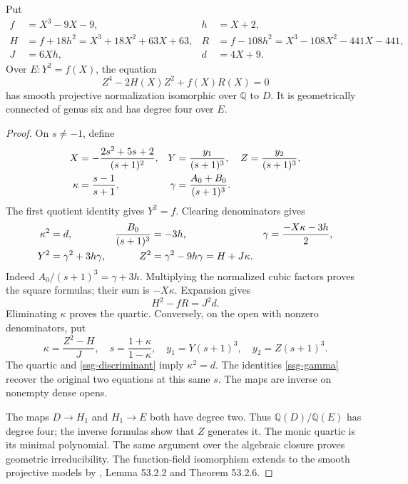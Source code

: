 \begin{theorem}\label{ssg-quartic}
Put
\begin{align*}
 f&=X^3-9X-9,& h&=X+2,\\
 H&=f+18h^2=X^3+18X^2+63X+63,&
 R&=f-108h^2=X^3-108X^2-441X-441,\\
 J&=6Xh,& d&=4X+9.
\end{align*}
Over \(E:Y^2=f(X)\), the equation
\begin{equation}\label{ssg-equation}
 Z^4-2H(X)Z^2+f(X)R(X)=0
\end{equation}
has smooth projective normalization isomorphic over \(\mathbb Q\) to
\(D\). It is geometrically connected of genus six and has degree four over \(E\).
\end{theorem}
\begin{proof}
On \(s\ne-1\), define
\begin{align}
 X&=-\frac{2s^2+5s+2}{(s+1)^2},&
 Y&=\frac{y_1}{(s+1)^3},&
 Z&=\frac{y_2}{(s+1)^3},\label{ssg-forward}\\
 \kappa&=\frac{s-1}{s+1},&
 \gamma&=\frac{A_0+B_0}{(s+1)^3}.&&\notag
\end{align}
The first quotient identity gives \(Y^2=f\). Clearing denominators gives
\begin{align}
 \kappa^2&=d,& \frac{B_0}{(s+1)^3}&=-3h,
 &\gamma&=\frac{-X\kappa-3h}{2},\label{ssg-gamma}\\
 Y^2&=\gamma^2+3h\gamma,&
 Z^2&=\gamma^2-9h\gamma=H+J\kappa.&&\notag
\end{align}
Indeed \(A_0/(s+1)^3=\gamma+3h\). Multiplying the normalized
cubic factors proves the square formulas; their sum is \(-X\kappa\).
Expansion gives
\begin{equation}\label{ssg-discriminant}
 H^2-fR=J^2d.
\end{equation}
Eliminating \(\kappa\) proves the quartic.
Conversely, on the open with nonzero denominators, put
\begin{equation}\label{ssg-inverse}
 \kappa=\frac{Z^2-H}{J},\quad
 s=\frac{1+\kappa}{1-\kappa},\quad
 y_1=Y(s+1)^3,\quad y_2=Z(s+1)^3.
\end{equation}
The quartic and \eqref{ssg-discriminant} imply \(\kappa^2=d\).
The identities \eqref{ssg-gamma} recover the original two equations
at this same \(s\). The maps are inverse on nonempty dense opens.

The maps \(D\to H_1\) and \(H_1\to E\) both have degree two.
Thus \(\mathbb Q(D)/\mathbb Q(E)\) has degree four; the inverse
formulas show that \(Z\) generates it. The monic quartic is its
minimal polynomial. The same argument over the algebraic closure
proves geometric irreducibility. The function-field isomorphism
extends to the smooth projective models by \cite{StacksCurves2026},
Lemma 53.2.2 and Theorem 53.2.6.
\end{proof}

